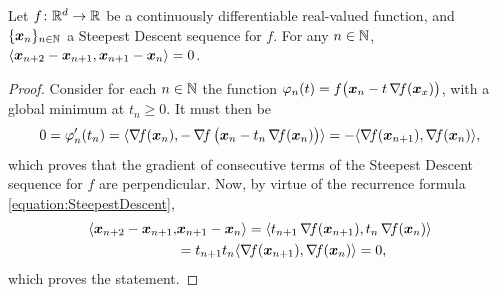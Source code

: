 \begin{theorem}\label{theorem:SteepestDescentPerpSteps}
Let $f \colon \mathbb{R}^d \to \mathbb{R}$ be a continuously differentiable real-valued function, and $\{ \boldsymbol{x}_n \}_{n\in\mathbb{N}}$ a Steepest Descent sequence for $f$.  For any $n \in \mathbb{N}$, $\langle \boldsymbol{x}_{n+2} - \boldsymbol{x}_{n+1}, \boldsymbol{x}_{n+1} - \boldsymbol{x}_n \rangle = 0$.
\end{theorem}
\begin{proof}
Consider for each $n \in \mathbb{N}$ the function $\varphi_n(t) = f\big(\boldsymbol{x}_n -t \mathop{\nabla\! {f}}(\boldsymbol{x}_x)\big)$, with a global minimum at $t_n \geq 0$.  It must then be
\begin{equation*}
0 = \varphi_n'(t_n) = \langle \mathop{\nabla\! {f}}(\boldsymbol{x}_n), -\mathop{\nabla\! {f}}\big( \boldsymbol{x}_n - t_n \mathop{\nabla\! {f}}(\boldsymbol{x}_n)\big) \rangle = - \langle \mathop{\nabla\! {f}}(\boldsymbol{x}_{n+1}), \mathop{\nabla\! {f}}(\boldsymbol{x}_n) \rangle,
\end{equation*}
which proves that the gradient of consecutive terms of the Steepest Descent sequence for $f$ are perpendicular.  Now, by virtue of the recurrence formula \eqref{equation:SteepestDescent},
\begin{align*}
\langle \boldsymbol{x}_{n+2} - \boldsymbol{x}_{n+1}, &\boldsymbol{x}_{n+1} - \boldsymbol{x}_n \rangle = \langle t_{n+1}\mathop{\nabla\! {f}}(\boldsymbol{x}_{n+1}), t_n \mathop{\nabla\! {f}}(\boldsymbol{x}_n) \rangle \\
&= t_{n+1}t_n \langle \mathop{\nabla\! {f}}(\boldsymbol{x}_{n+1}), \mathop{\nabla\! {f}}(\boldsymbol{x}_n) \rangle = 0, 
\end{align*}
which proves the statement.
\end{proof}

